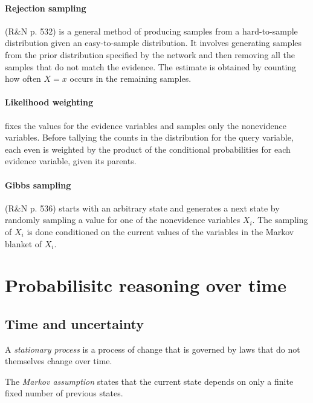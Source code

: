 \documentclass{article}
\begin{document}
\paragraph{Rejection sampling} (R\&N p. 532) is a general method of producing samples from a hard-to-sample
distribution given an easy-to-sample distribution. It involves generating samples from the
prior distribution specified by the network and then removing all the samples that do not
match the evidence. The estimate is obtained by counting how often $X=x$ occurs in the remaining
samples.

\paragraph{Likelihood weighting} fixes the values for the evidence variables and samples
only the nonevidence variables. Before tallying the counts in the distribution for the query
variable, each even is weighted by the product of the conditional probabilities for each evidence
variable, given its parents.

\paragraph{Gibbs sampling} (R\&N p. 536) starts with an arbitrary state and generates a next state by randomly
sampling a value for one of the nonevidence variables $X_i$. The sampling of $X_i$ is done
conditioned on the current values of the variables in the Markov blanket of $X_i$.

\section{Probabilisitc reasoning over time}

\subsection{Time and uncertainty}

\begin{definition}[R\&N p. 568]
    A \emph{stationary process} is a process of change that is governed by laws
    that do not themselves change over time.
\end{definition}

\begin{definition}
    The \emph{Markov assumption} states that the current
    state depends on only a finite fixed number of previous states.
\end{definition}
\end{document}
